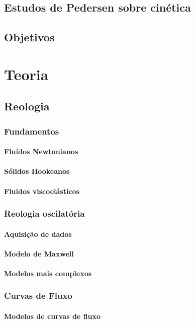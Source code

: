 \documentclass[a4paper, 10pt]{book}
\begin{document}
		\chapter{Estudos de Pedersen sobre cinética}
	\chapter{Objetivos}

\part{Teoria}
	\chapter{Reologia}
		\section{Fundamentos}
			\subsection{Fluídos Newtonianos}
			\subsection{Sólidos Hookeanos}
			\subsection{Fluidos viscoelásticos}
		\section{Reologia oscilatória}
			\subsection{Aquisição de dados}
			\subsection{Modelo de Maxwell}
			\subsection{Modelos mais complexos}
		\section{Curvas de Fluxo}
			\subsection{Modelos de curvas de fluxo}
\end{document}
